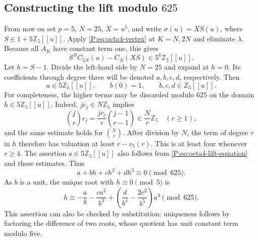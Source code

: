 \documentclass[11pt,a4paper]{article}
\theoremstyle{definition}\newtheorem{definition}[theorem]{Definition}
\theoremstyle{remark}\newtheorem{remark}[theorem]{Remark}
\numberwithin{equation}{section}
\begin{document}
\subsection{Constructing the lift modulo \(625\)}

From now on set \(p=5\), \(N=25\), \(X=u^5\), and write
\(\sigma(u)=X S(u)\), where \(S\in1+5\mathbb Z_5[[u]]\).
Apply \eqref{P:eq:octa4-vertex} at \(K=N,2N\) and eliminate
\(\lambda\).  Because all \(A_K\) have constant term one, this gives
\begin{equation}\label{P:eq:octa4-lift-equation}
 S^N C_{5N}(u)-C_N(XS)\in5^6\mathbb Z_5[[u]].
\end{equation}
Let \(h=S-1\).  Divide the left-hand side by \(N=25\) and
expand at \(h=0\).  Its coefficients through degree three will
be denoted \(a,b,c,d\), respectively.  Then
\[
 a\in5\mathbb Z_5[[u]],\qquad b(0)=1,
 \qquad b,c,d\in\mathbb Z_5[[u]].
\]
For completeness, the higher terms may be discarded modulo
\(625\) on the domain \(h\in5\mathbb Z_5[[u]]\).
Indeed, \(j c_j\in N\mathbb Z_5\) implies
\[
 \binom jr c_j=\frac{j c_j}{r}\binom{j-1}{r-1}
       \in \frac Nr\mathbb Z_5\quad(r\geq1),
\]
and the same estimate holds for \(\binom Nr\).
After division by \(N\), the term of degree \(r\) in \(h\)
therefore has valuation at least \(r-v_5(r)\).  This is at least
four whenever \(r\geq4\).  The assertion \(a\in5\mathbb Z_5[[u]]\)
also follows from \eqref{P:eq:octa4-lift-equation} and these estimates.
Thus
\[
 a+bh+ch^2+dh^3\equiv0\pmod{625}.
\]
As \(b\) is a unit, the unique root with \(h\equiv0\pmod5\) is
\begin{equation}\label{P:eq:octa4-rational-h}
 h\equiv-\frac ab-\frac{ca^2}{b^3}
       +\left(\frac d{b^4}-\frac{2c^2}{b^5}\right)a^3
       \pmod{625}.
\end{equation}
This assertion can also be checked by substitution; uniqueness
follows by factoring the difference of two roots, whose quotient
has unit constant term modulo five.
\end{document}
